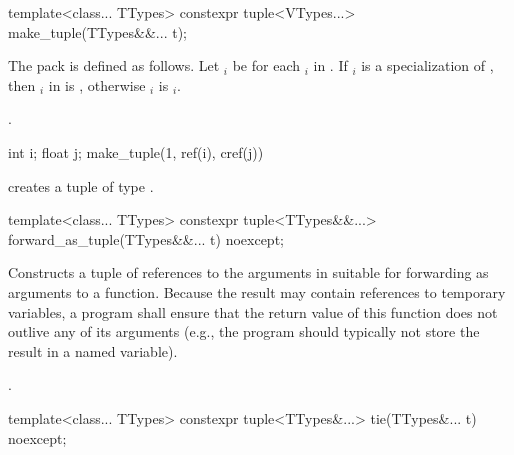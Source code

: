 %
%
\begin{itemdecl}
template<class... TTypes>
  constexpr tuple<VTypes...> make_tuple(TTypes&&... t);
\end{itemdecl}

\begin{itemdescr}
\pnum
The pack  is defined as follows. Let $_i$ be  for each
$_i$ in . If $_i$ is a specialization of
, then $_i$ in  is ,
otherwise $_i$ is $_i$.

\pnum
\returns {}.

\pnum
\begin{example}
\begin{codeblock}
int i; float j;
make_tuple(1, ref(i), cref(j))
\end{codeblock}
creates a tuple of type .
\end{example}
\end{itemdescr}

%
%
\begin{itemdecl}
template<class... TTypes>
  constexpr tuple<TTypes&&...> forward_as_tuple(TTypes&&... t) noexcept;
\end{itemdecl}

\begin{itemdescr}
\pnum
\effects Constructs a tuple of references to the arguments in  suitable
for forwarding as arguments to a function. Because the result may contain references
to temporary variables, a program shall ensure that the return value of this
function does not outlive any of its arguments (e.g., the program should typically
not store the result in a named variable).

\pnum
\returns {}.
\end{itemdescr}

%
%
%
\begin{itemdecl}
template<class... TTypes>
  constexpr tuple<TTypes&...> tie(TTypes&... t) noexcept;
\end{itemdecl}

